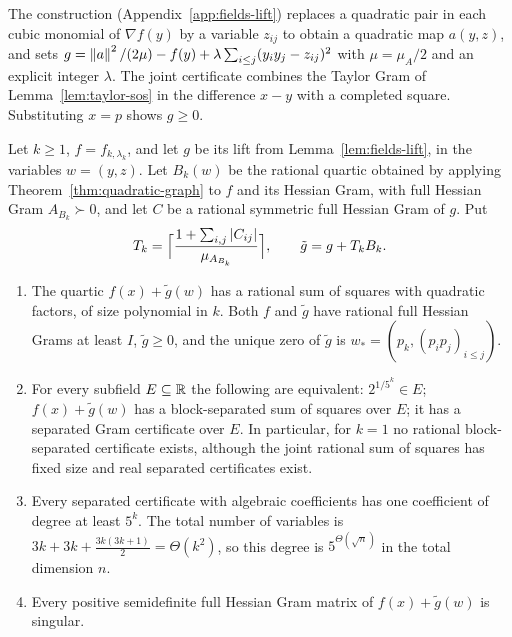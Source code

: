 The construction (Appendix~\ref{app:fields-lift}) replaces a quadratic
pair in each cubic monomial of $\nabla f(y)$ by a variable $z_{ij}$ to obtain
a quadratic map $a(y,z)$, and sets
$g=\left\lVert a\right\rVert^2/(2\mu)-f(y)+\lambda\sum_{i\le j}(y_iy_j-z_{ij})^2$ with
$\mu=\mu_A/2$ and an explicit integer $\lambda$. The joint certificate
combines the Taylor Gram of Lemma~\ref{lem:taylor-sos} in the difference
$x-y$ with a completed square. Substituting $x=p$ shows $g\ge0$.

\begin{theorem}
\label{thm:fields-blocks}
Let $k\ge1$, $f=f_{k,\lambda_k}$, and let $g$ be its lift from
Lemma~\ref{lem:fields-lift}, in the variables $w=(y,z)$. Let $B_k(w)$ be the
rational quartic obtained by applying Theorem~\ref{thm:quadratic-graph} to
$f$ and its Hessian Gram, with full Hessian Gram $A_{B_k}\succ0$, and let
$C$ be a rational symmetric full Hessian Gram of $g$. Put
\[
 T_k=\Bigl\lceil\frac{1+\sum_{i,j}|C_{ij}|}{\mu_{A_{B_k}}}\Bigr\rceil,
 \qquad \tilde g=g+T_kB_k .
\]
\begin{enumerate}[label=(\alph*)]
\item The quartic $f(x)+\tilde g(w)$ has a rational sum of squares with
  quadratic factors, of size polynomial in $k$. Both $f$ and $\tilde g$ have
  rational full Hessian Grams at least $I$, $\tilde g\ge0$, and the unique
  zero of $\tilde g$ is $w_*=(p_k,(p_ip_j)_{i\le j})$.
\item For every subfield $E\subseteq\mathbb R$ the following are equivalent:
  $2^{1/5^k}\in E$; $f(x)+\tilde g(w)$ has a block-separated sum of squares
  over $E$; it has a separated Gram certificate over $E$. In particular, for
  $k=1$ no rational block-separated certificate exists, although the joint
  rational sum of squares has fixed size and real separated certificates
  exist.
\item Every separated certificate with algebraic coefficients has one
  coefficient of degree at least $5^k$. The total number of variables is
  $3k+3k+\frac{3k(3k+1)}2=\Theta(k^2)$, so this degree is
  $5^{\Theta(\sqrt{n})}$ in the total dimension $n$.
\item Every positive semidefinite full Hessian Gram matrix of
  $f(x)+\tilde g(w)$ is singular.
\end{enumerate}
\end{theorem}

